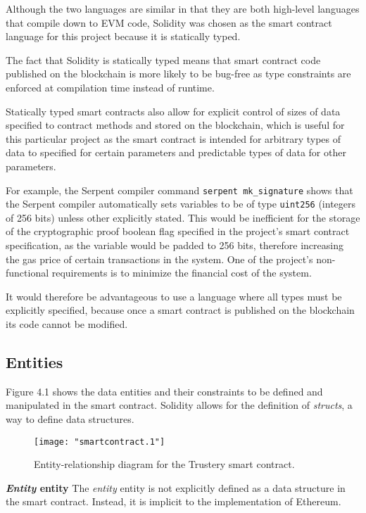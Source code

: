 \documentclass[12pt,a4paper]{report}
\newcommand{\code}{\texttt}
\begin{document}
	Although the two languages are similar in that they are both high-level languages that compile down to EVM code, Solidity was chosen as the smart contract language for this project because it is statically typed.
	
	The fact that Solidity is statically typed means that smart contract code published on the blockchain is more likely to be bug-free as type constraints are enforced at compilation time instead of runtime.
	
	Statically typed smart contracts also allow for explicit control of sizes of data specified to contract methods and stored on the blockchain, which is useful for this particular project as the smart contract is intended for arbitrary types of data to specified for certain parameters and predictable types of data for other parameters.
	
	For example, the Serpent compiler command \code{serpent mk\_signature} shows that the Serpent compiler automatically sets variables to be of type \code{uint256} (integers of 256 bits) unless other explicitly stated. This would be inefficient for the storage of the cryptographic proof boolean flag specified in the project's smart contract specification, as the variable would be padded to 256 bits\cite{14}, therefore increasing the gas price of certain transactions in the system. One of the project's non-functional requirements is to minimize the financial cost of the system.
	
	It would therefore be advantageous to use a language where all types must be explicitly specified, because once a smart contract is published on the blockchain its code cannot be modified.
	
	\subsection{Entities}
	Figure 4.1 shows the data entities and their constraints to be defined and manipulated in the smart contract. Solidity allows for the definition of \textit{structs}, a way to define data structures.\cite{13}
	\begin{figure}[!ht]
		\centering
			\texttt{[image: "smartcontract.1"]}
		\caption{Entity-relationship diagram for the Trustery smart contract.}
	\end{figure}
	
	\bigskip
	\noindent \textbf{\textit{Entity} entity}\newline
	The \textit{entity} entity is not explicitly defined as a data structure in the smart contract. Instead, it is implicit to the implementation of Ethereum.
	
\end{document}
